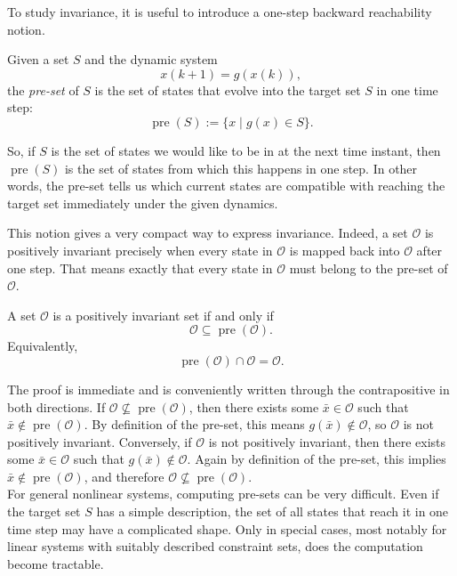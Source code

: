 To study invariance, it is useful to introduce a one-step backward reachability notion.

\begin{theorembox}
Given a set \(S\) and the dynamic system
\[
x(k+1)=g(x(k)),
\]
the \emph{pre-set} of \(S\) is the set of states that evolve into the target set \(S\) in one time step:
\[
\operatorname{pre}(S):=\{x \mid g(x)\in S\}.
\]
\end{theorembox}

So, if \(S\) is the set of states we would like to be in at the next time instant, then
\(\operatorname{pre}(S)\) is the set of states from which this happens in one step. In other words,
the pre-set tells us which current states are compatible with reaching the target set immediately
under the given dynamics.

This notion gives a very compact way to express invariance. Indeed, a set \(\mathcal O\) is positively
invariant precisely when every state in \(\mathcal O\) is mapped back into \(\mathcal O\) after one step.
That means exactly that every state in \(\mathcal O\) must belong to the pre-set of \(\mathcal O\).

\begin{theorembox}
A set \(\mathcal O\) is a positively invariant set if and only if
\[
\mathcal O \subseteq \operatorname{pre}(\mathcal O).
\]
Equivalently,
\[
\operatorname{pre}(\mathcal O)\cap \mathcal O = \mathcal O.
\]
\end{theorembox}
The proof is immediate and is conveniently written through the contrapositive in both directions.
If \(\mathcal O \not\subseteq \operatorname{pre}(\mathcal O)\), then there exists some
\(\bar x\in \mathcal O\) such that \(\bar x\notin \operatorname{pre}(\mathcal O)\). By definition of
the pre-set, this means \(g(\bar x)\notin \mathcal O\), so \(\mathcal O\) is not positively invariant.
Conversely, if \(\mathcal O\) is not positively invariant, then there exists some \(\bar x\in \mathcal O\)
such that \(g(\bar x)\notin \mathcal O\). Again by definition of the pre-set, this implies
\(\bar x\notin \operatorname{pre}(\mathcal O)\), and therefore
\(\mathcal O\not\subseteq \operatorname{pre}(\mathcal O)\).\\

For general nonlinear systems, computing pre-sets can be very difficult. Even if the target set \(S\)
has a simple description, the set of all states that reach it in one time step may have a complicated
shape. Only in special cases, most notably for linear systems with suitably described constraint
sets, does the computation become tractable.

